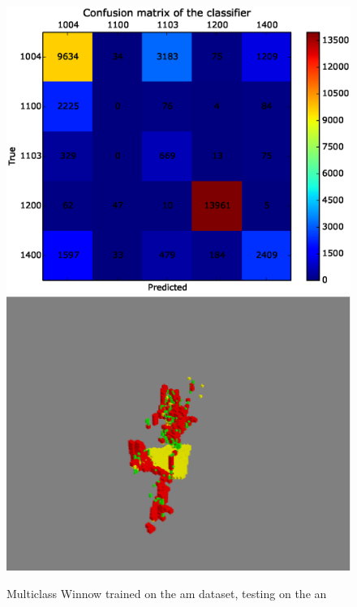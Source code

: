 \documentclass[10pt,a4paper]{article}
\begin{document}
\begin{figure}[htp]
\centering
\includegraphics[scale=0.4,trim = 0.3 0.3 0.3 0.3,clip]{figs/winnow_amtoan_test1.eps}
\includegraphics[scale=0.4]{figs/winnow_amtoan_test1_plot.eps}
\caption{Multiclass Winnow trained on the am dataset, testing on the an}
\vspace{0.1 in}

\end{figure}
\end{document}
